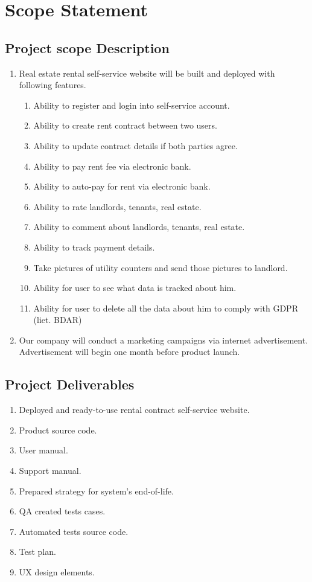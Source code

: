 \documentclass{VUMIFPSkursinis}
\begin{document}
\section{Scope Statement}
	\subsection{Project scope Description}
		\begin{enumerate}
			\item{Real estate rental self-service website will be built and deployed with following features.}
				\begin{enumerate}
					\item{Ability to register and login into self-service account.}
					\item{Ability to create rent contract between two users.}
					\item{Ability to update contract details if both parties agree.}
					\item{Ability to pay rent fee via electronic bank.}
					\item{Ability to auto-pay for rent via electronic bank.}
					\item{Ability to rate landlords, tenants, real estate.}
					\item{Ability to comment about landlords, tenants, real estate.}
					\item{Ability to track payment details.}
					\item{Take pictures of utility counters and send those pictures to landlord.}
					\item{Ability for user to see what data is tracked about him.}
					\item{Ability for user to delete all the data about him to comply with GDPR (liet. BDAR)}
				\end{enumerate}
			\item{Our company will conduct a marketing campaigns via internet advertisement. Advertisement will begin one month before product launch.}
		\end{enumerate}

	\subsection{Project Deliverables}
		\begin{enumerate}
			\item{Deployed and ready-to-use rental contract self-service website.}
			\item{Product source code.}
			\item{User manual.}
			\item{Support manual.}
			\item{Prepared strategy for system's end-of-life.}
			\item{QA created tests cases.}
			\item{Automated tests source code.}
			\item{Test plan.}
			\item{UX design elements.}
		\end{enumerate}
\end{document}
